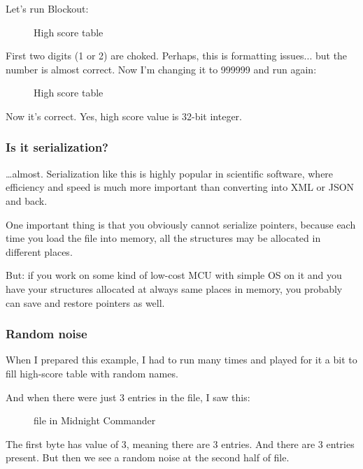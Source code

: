 Let's run Blockout:

\begin{figure}[H]
\centering
{}
\caption{High score table}
\end{figure}

First two digits (1 or 2) are choked. Perhaps, this is formatting issues... but the number is almost correct.
Now I'm changing it to 999999 and run again:

\begin{figure}[H]
\centering
{}
\caption{High score table}
\end{figure}

Now it's correct. Yes, high score value is 32-bit integer.

\subsubsection{Is it serialization?}

\dots almost.
Serialization like this is highly popular in scientific software, where efficiency and speed is much more important
than converting into \ac{XML} or \ac{JSON} and back.

One important thing is that you obviously cannot serialize pointers, because each time you load the file into memory,
all the structures may be allocated in different places.

But: if you work on some kind of low-cost \ac{MCU} with simple \ac{OS} on it
and you have your structures allocated at always same
places in memory, you probably can save and restore pointers as well.

\subsubsection{Random noise}

When I prepared this example, I had to run  many times and played for it a bit
to fill high-score table with random names.

And when there were just 3 entries in the file, I saw this:

\begin{figure}[H]
\centering
{}
\caption{ file in Midnight Commander}
\end{figure}

The first byte has value of 3, meaning there are 3 entries.
And there are 3 entries present.
But then we see a random noise at the second half of file.

